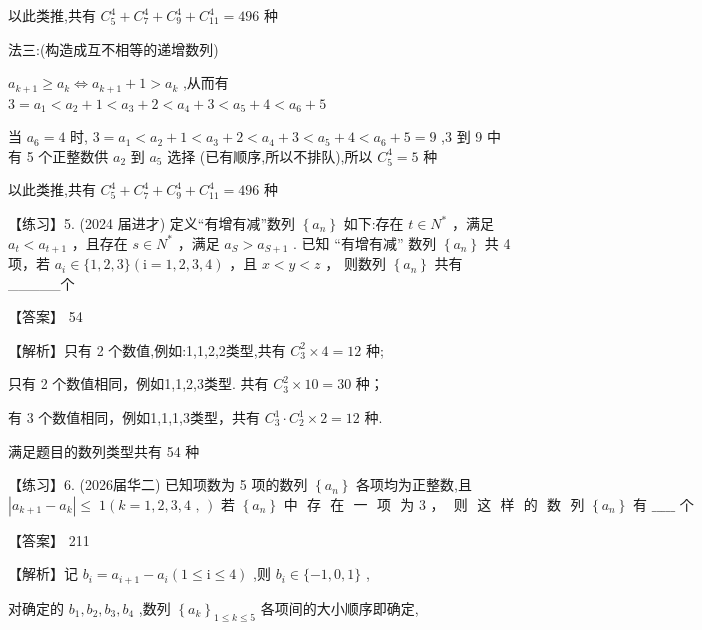 \documentclass[10pt]{article}
\begin{document}
以此类推,共有 \({C}_{5}^{4} + {C}_{7}^{4} + {C}_{9}^{4} + {C}_{11}^{4} = {496}\) 种

法三:(构造成互不相等的递增数列)

\({a}_{k + 1} \geq  {a}_{k} \Leftrightarrow  {a}_{k + 1} + 1 > {a}_{k}\) ,从而有 \(3 = {a}_{1} < {a}_{2} + 1 < {a}_{3} + 2 < {a}_{4} + 3 < {a}_{5} + 4 < {a}_{6} + 5\)

当 \({a}_{6} = 4\) 时, \(3 = {a}_{1} < {a}_{2} + 1 < {a}_{3} + 2 < {a}_{4} + 3 < {a}_{5} + 4 < {a}_{6} + 5 = 9\) ,3 到 9 中有 5 个正整数供 \({a}_{2}\) 到 \({a}_{5}\) 选择 (已有顺序,所以不排队),所以 \({C}_{5}^{4} = 5\) 种

以此类推,共有 \({C}_{5}^{4} + {C}_{7}^{4} + {C}_{9}^{4} + {C}_{11}^{4} = {496}\) 种

【练习】5. (2024 届进才) 定义“有增有减”数列 \(\left\{  {a}_{n}\right\}\) 如下:存在 \(t \in  {N}^{ * }\) ，满足 \({a}_{t} < {a}_{t + 1}\) ，且存在 \(s \in  {N}^{ * }\) ，满足 \({a}_{S} > {a}_{S + 1}\) . 已知 “有增有减” 数列 \(\left\{  {a}_{n}\right\}\) 共 4 项，若 \({a}_{i} \in  \{ 1,2,3\} \left( {\mathrm{i} = 1,2,3,4}\right)\) ，且 \(x < y < z\) ， 则数列 \(\left\{  {a}_{n}\right\}\) 共有\_\_\_\_\_个

【答案】 54

【解析】只有 2 个数值,例如:1,1,2,2类型,共有 \({C}_{3}^{2} \times  4 = {12}\) 种;

只有 2 个数值相同，例如1,1,2,3类型. 共有 \({C}_{3}^{2} \times  {10} = {30}\) 种；

有 3 个数值相同，例如1,1,1,3类型，共有 \({C}_{3}^{1} \cdot  {C}_{2}^{1} \times  2 = {12}\) 种.

满足题目的数列类型共有 54 种

【练习】6. (2026届华二) 已知项数为 5 项的数列 \(\left\{  {a}_{n}\right\}\) 各项均为正整数,且 \(\left| {{a}_{k + 1} - {a}_{k}}\right|  \leq \; 1\left( {k = 1,2,3,4\text{ , }}\right) \text{ 若 }\left\{  {a}_{n}\right\}  {\text{ 中 }\text{ 存 }\text{ 在 }\text{ 一 }\text{ 项 }\text{ 为 }3\text{ ， }\text{ 则 }\text{ 这 }\text{ 样 }\text{ 的 }\text{ 数 }\text{ 列 }}\left\{  {a}_{n}\right\}  {\text{ 有 }\_\_\_\_\_ \text{ 个 }}\)

【答案】 211

【解析】记 \({b}_{i} = {a}_{i + 1} - {a}_{i}\left( {1 \leq  \mathrm{i} \leq  4}\right)\) ,则 \({b}_{i} \in  \{  - 1,0,1\}\) ,

对确定的 \({b}_{1},{b}_{2},{b}_{3},{b}_{4}\) ,数列 \({\left\{  {a}_{k}\right\}  }_{1 \leq  k \leq  5}\) 各项间的大小顺序即确定,
\end{document}
